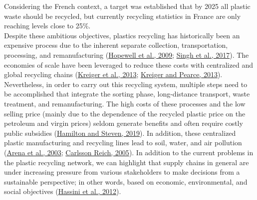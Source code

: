 \documentclass[12pt]{elsarticle} %
\begin{document}
Considering the French context, a target was established that by 2025 all plastic waste should be recycled, but currently recycling statistics in France are only reaching levels close to 25\%.\\
Despite these ambitious objectives, plastics recycling has historically been an expensive process due to the inherent separate collection, transportation, processing, and remanufacturing (\protect\hyperlink{ref-Hopewell2009}{Hopewell et al., 2009}; \protect\hyperlink{ref-Singh2017b}{Singh et al., 2017}).
The economies of scale have been leveraged to reduce these costs with centralized and global recycling chains (\protect\hyperlink{ref-Anzalone2013}{Kreiger et al., 2013}; \protect\hyperlink{ref-Kreiger2013}{Kreiger and Pearce, 2013}).
Nevertheless, in order to carry out this recycling system, multiple steps need to be accomplished that integrate the sorting phase, long-distance transport, waste treatment, and remanufacturing. The high costs of these processes and the low selling price (mainly due to the dependence of the recycled plastic price on the petroleum and virgin prices) seldom generate benefits and often require costly public subsidies (\protect\hyperlink{ref-hamilton2019}{Hamilton and Steven, 2019}).
In addition, these centralized plastic manufacturing and recycling lines lead to soil, water, and air pollution (\protect\hyperlink{ref-Arena2003}{Arena et al., 2003}; \protect\hyperlink{ref-carlssonreich2005}{Carlsson Reich, 2005}).
In addition to the current problems in the plastic recycling network, we can highlight that supply chains in general are under increasing pressure from various stakeholders to make decisions from a sustainable perspective; in other words, based on economic, environmental, and social objectives (\protect\hyperlink{ref-hassini2012}{Hassini et al., 2012}).
\end{document}
